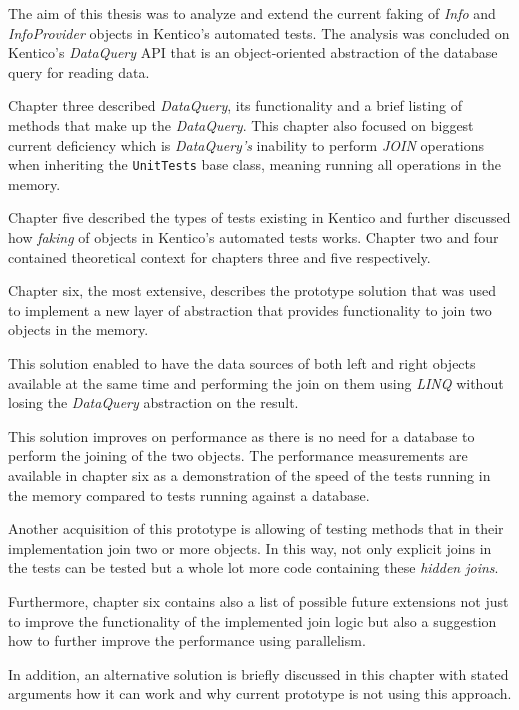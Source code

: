 \documentclass[
  print,
  table,
  nolof,
  nolot,
  nocover,
  oneside
]{fithesis3}
\begin{document}
The aim of this thesis was to analyze and extend the current faking of \textit{Info} and \textit{InfoProvider} objects in Kentico's automated tests. The analysis was concluded on Kentico's \textit{DataQuery} API that is an object-oriented abstraction of the database query for reading data.

Chapter three described \textit{DataQuery}, its functionality and a brief listing of methods that make up the \textit{DataQuery}. This chapter also focused on biggest current deficiency which is \textit{DataQuery's} inability to perform \textit{JOIN} operations when inheriting the \texttt{UnitTests} base class, meaning running all operations in the memory.

Chapter five described the types of tests existing in Kentico and further discussed how \textit{faking} of objects in Kentico's automated tests works. Chapter two and four contained theoretical context for chapters three and five respectively.

Chapter six, the most extensive, describes the prototype solution that was used to implement a new layer of abstraction that provides functionality to join two objects in the memory.

This solution enabled to have the data sources of both left and right objects available at the same time and performing the join on them using \textit{LINQ} without losing the \textit{DataQuery} abstraction on the result.

This solution improves on performance as there is no need for a database to perform the joining of the two objects. The performance measurements are available in chapter six as a demonstration of the speed of the tests running in the memory compared to tests running against a database.

Another acquisition of this prototype is allowing of testing methods that in their implementation join two or more objects. In this way, not only explicit joins in the tests can be tested but a whole lot more code containing these \textit{hidden joins}.

Furthermore, chapter six contains also a list of possible future extensions not just to improve the functionality of the implemented join logic but also a suggestion how to further improve the performance using parallelism.

In addition, an alternative solution is briefly discussed in this chapter with stated arguments how it can work and why current prototype is not using this approach.
\end{document}
